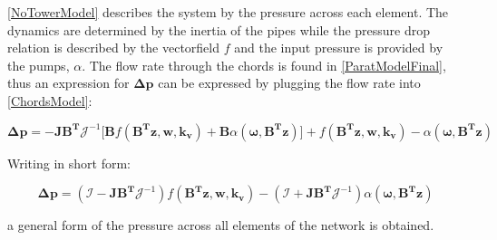 \eqref{NoTowerModel} describes the system by the pressure across each element. The dynamics are determined by the inertia of the pipes while the pressure drop relation is described by the vectorfield $f$ and the input pressure is provided by the pumps, $\alpha$. 
The flow rate through the chords is found in \eqref{ParatModelFinal}, thus an expression for $ \bm{\Delta p} $ can be expressed by plugging the flow rate into \eqref{ChordsModel}: 

\begin{equation}
 \bm{\Delta p} =  -\bm{J} \bm{B^T}\mathcal{J}^{-1} \Big[ \bm{B} f(\bm{B^T}\bm{z}, \bm{w}, \bm{k_v}) + \bm{B}\alpha (\bm{\omega},\bm{B^T}\bm{z}) \Big ] + f(\bm{B^T}\bm{z}, \bm{w}, \bm{k_v}) - \alpha (\bm{\omega},\bm{B^T}\bm{z})
  \label{PressureLarge}
 \end{equation}
 
Writing in short form:
 
 \begin{equation}
  \bm{\Delta p} = (\mathcal{I} - \bm{J} \bm{B^T}\mathcal{J}^{-1} ) f(\bm{B^T}\bm{z}, \bm{w}, \bm{k_v}) - (\mathcal{I} + \bm{J} \bm{B^T}\mathcal{J}^{-1} ) \alpha (\bm{\omega},\bm{B^T}\bm{z})
  \label{PressureShort}
 \end{equation}

a general form of the pressure across all elements of the network is obtained. 


